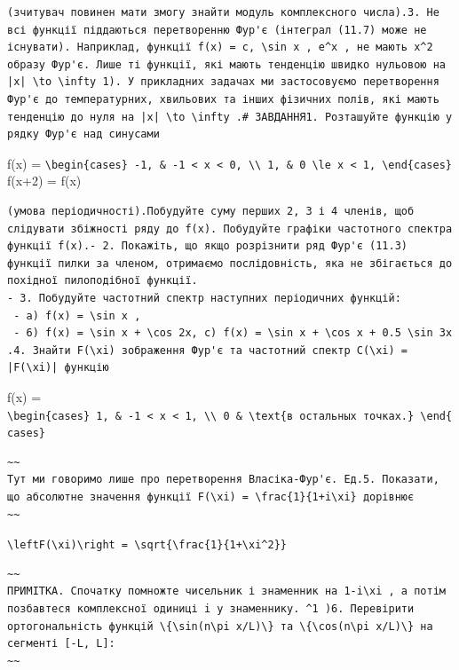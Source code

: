 \documentclass[
  ukrainian,
]{article}
\begin{document}
\begin{verbatim}
(зчитувач повинен мати змогу знайти модуль комплексного числа).3. Не всі функції піддаються перетворенню Фур'є (інтеграл (11.7) може не існувати). Наприклад, функції f(x) = c, \sin x , e^x , не мають x^2 образу Фур'є. Лише ті функції, які мають тенденцію швидко нульовою на |x| \to \infty 1). У прикладних задачах ми застосовуємо перетворення Фур'є до температурних, хвильових та інших фізичних полів, які мають тенденцію до нуля на |x| \to \infty .# ЗАВДАННЯ1. Розташуйте функцію у рядку Фур'є над синусами
\end{verbatim}

f(x) =
\texttt{\textbackslash{}begin\{cases\}\ -1,\ \&\ -1\ \textless{}\ x\ \textless{}\ 0,\ \textbackslash{}\textbackslash{}\ 1,\ \&\ 0\ \textbackslash{}le\ x\ \textless{}\ 1,\ \textbackslash{}end\{cases\}}
f(x+2) = f(x)

\begin{verbatim}
(умова періодичності).Побудуйте суму перших 2, 3 і 4 членів, щоб слідувати збіжності ряду до f(x). Побудуйте графіки частотного спектра функції f(x).- 2. Покажіть, що якщо розрізнити ряд Фур'є (11.3) функції пилки за членом, отримаємо послідовність, яка не збігається до похідної пилоподібної функції.
- 3. Побудуйте частотний спектр наступних періодичних функцій:
 - a) f(x) = \sin x ,
 - 6) f(x) = \sin x + \cos 2x, c) f(x) = \sin x + \cos x + 0.5 \sin 3x .4. Знайти F(\xi) зображення Фур'є та частотний спектр C(\xi) = |F(\xi)| функцію
\end{verbatim}

f(x) =
\texttt{\textbackslash{}begin\{cases\}\ 1,\ \&\ -1\ \textless{}\ x\ \textless{}\ 1,\ \textbackslash{}\textbackslash{}\ 0\ \&\ \textbackslash{}text\{в\ остальных\ точках.\}\ \textbackslash{}end\{cases\}}

\begin{verbatim}
~~
Тут ми говоримо лише про перетворення Власіка-Фур'є. Ед.5. Показати, що абсолютне значення функції F(\xi) = \frac{1}{1+i\xi} дорівнює
~~
\end{verbatim}

\texttt{\textbackslash{}left\textbar{}F(\textbackslash{}xi)\textbackslash{}right\textbar{}\ =\ \textbackslash{}sqrt\{\textbackslash{}frac\{1\}\{1+\textbackslash{}xi\^{}2\}\}}

\begin{verbatim}
~~
ПРИМІТКА. Спочатку помножте чисельник і знаменник на 1-i\xi , а потім позбавтеся комплексної одиниці i у знаменнику. ^1 )6. Перевірити ортогональність функцій \{\sin(n\pi x/L)\} та \{\cos(n\pi x/L)\} на сегменті [-L, L]:
~~
\end{verbatim}
\end{document}
